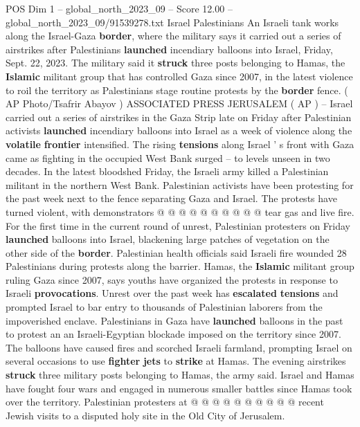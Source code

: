 \begin{textsample}{POS Dim 1 – global\_north\_2023\_09 – Score 12.00 – global\_north\_2023\_09/91539278.txt}  \label{ex:f1_pos_114}
Israel Palestinians An Israeli tank works along the Israel-Gaza \textbf{border}, where the military says it carried out a series of airstrikes after Palestinians \textbf{launched} incendiary balloons into Israel, Friday, Sept. 22, 2023.
The military said it \textbf{struck} three posts belonging to Hamas, the \textbf{Islamic} militant group that has controlled Gaza since 2007, in the latest violence to roil the territory as Palestinians stage routine protests by the \textbf{border} fence. ( AP Photo/Tsafrir Abayov ) ASSOCIATED PRESS JERUSALEM ( AP ) -- Israel carried out a series of airstrikes in the Gaza Strip late on Friday after Palestinian activists \textbf{launched} incendiary balloons into Israel as a week of violence along the \textbf{volatile} \textbf{frontier} intensified.
The rising \textbf{tensions} along Israel ' s front with Gaza came as fighting in the occupied West Bank surged -- to levels unseen in two decades.
In the latest bloodshed Friday, the Israeli army killed a Palestinian militant in the northern West Bank.
Palestinian activists have been protesting for the past week next to the fence separating Gaza and Israel.
The protests have turned violent, with demonstrators @ @ @ @ @ @ @ @ @ @ tear gas and live fire.
For the first time in the current round of unrest, Palestinian protesters on Friday \textbf{launched} balloons into Israel, blackening large patches of vegetation on the other side of the \textbf{border}.
Palestinian health officials said Israeli fire wounded 28 Palestinians during protests along the barrier.
Hamas, the \textbf{Islamic} militant group ruling Gaza since 2007, says youths have organized the protests in response to Israeli \textbf{provocations}.
Unrest over the past week has \textbf{escalated} \textbf{tensions} and prompted Israel to bar entry to thousands of Palestinian laborers from the impoverished enclave.
Palestinians in Gaza have \textbf{launched} balloons in the past to protest an an Israeli-Egyptian blockade imposed on the territory since 2007.
The balloons have caused fires and scorched Israeli farmland, prompting Israel on several occasions to use \textbf{fighter} \textbf{jets} to \textbf{strike} at Hamas.
The evening airstrikes \textbf{struck} three military posts belonging to Hamas, the army said.
Israel and Hamas have fought four wars and engaged in numerous smaller battles since Hamas took over the territory.
Palestinian protesters at @ @ @ @ @ @ @ @ @ @ recent Jewish visits to a disputed holy site in the Old City of Jerusalem.

\end{textsample}
